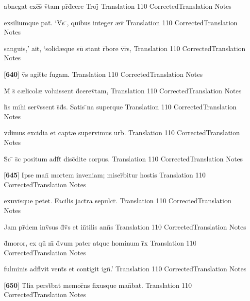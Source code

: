 \latline
  {abnegat exc\={\macron {\i}}s\={} v\={\macron {\i}}tam pr\={}d\={}cere Troj\={}}
  { Translation }
  {110}
  { CorrectedTranslation }
  { Notes }


\latline
  {exsiliumque pat\={\macron {\i}}.  `V\={}s \={}, quibus integer {\ae}v\={\macron {\i}}}
  { Translation }
  {110}
  { CorrectedTranslation }
  { Notes }


\latline
  {sanguis,' ait, `solid{\ae}que su\={} stant r\={}bore v\={\macron {\i}}r\={}s,}
  { Translation }
  {110}
  { CorrectedTranslation }
  { Notes }


\latline
  {[\textbf{640}] v\={}s agit\={}te fugam.}
  { Translation }
  {110}
  { CorrectedTranslation }
  { Notes }


\latline
  {M\={} s\={\macron {\i}} c{\ae}licol{\ae} voluissent d\={}cerev\={\macron {\i}}tam,}
  { Translation }
  {110}
  { CorrectedTranslation }
  { Notes }


\latline
  {h\={}s mihi serv\={}ssent s\={}d\={}s.  Satis \={}na superque}
  { Translation }
  {110}
  { CorrectedTranslation }
  { Notes }


\latline
  {v\={\macron {\i}}dimus excidia et capt{\ae} super\={}vimus urb\={\macron {\i}}.}
  { Translation }
  {110}
  { CorrectedTranslation }
  { Notes }


\latline
  {S\={\macron {\i}}c \={} s\={\macron {\i}}c positum adf\={}t\={\macron {\i}} disc\={}dite corpus.}
  { Translation }
  {110}
  { CorrectedTranslation }
  { Notes }


\latline
  {[\textbf{645}] Ipse man\={} mortem inveniam; miser\={}bitur hostis}
  { Translation }
  {110}
  { CorrectedTranslation }
  { Notes }


\latline
  {exuvi\={}sque petet.  Facilis jact\={}ra sepulcr\={\macron {\i}}.}
  { Translation }
  {110}
  { CorrectedTranslation }
  { Notes }


\latline
  {Jam pr\={\macron {\i}}dem inv\={\macron {\i}}sus d\={\macron {\i}}v\={\macron {\i}}s et in\={}tilis ann\={}s}
  { Translation }
  {110}
  { CorrectedTranslation }
  { Notes }


\latline
  {d\={}moror, ex qu\={} m\={} d\={\macron {\i}}vum pater atque hominum r\={}x}
  { Translation }
  {110}
  { CorrectedTranslation }
  { Notes }


\latline
  {fulminis adfl\={}vit vent\={\macron {\i}}s et contigit ign\={\macron {\i}}.'}
  { Translation }
  {110}
  { CorrectedTranslation }
  { Notes }

\latline
  {[\textbf{650}]  T\={}lia perst\={}bat memor\={}ns fixusque man\={}bat.}
  { Translation }
  {110}
  { CorrectedTranslation }
  { Notes }





